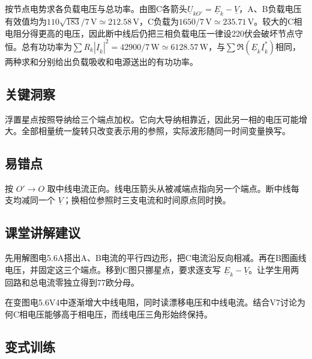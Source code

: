 \documentclass[UTF8,fontset=fandol,a4paper,11pt]{ctexart}
\begin{document}
按节点电势求各负载电压与总功率。由图C各箭头$\underline U_{kO'}=\underline E_k-\underline V$，A、B负载电压有效值均为$110\sqrt{183}/7\,\mathrm V\simeq212.58\,\mathrm V$，C负载为$1650/7\,\mathrm V\simeq235.71\,\mathrm V$。较大的C相电阻分得更高的电压，因此断中线后仍把三相负载电压一律设220伏会破坏节点守恒。总有功功率为$\sum R_k|\underline I_k|^2=42900/7\,\mathrm W\simeq6128.57\,\mathrm W$，与$\sum\Re(\underline E_k\underline I_k^*)$相同，两种求和分别给出负载吸收和电源送出的有功功率。




\subsection*{关键洞察}

浮置星点按照导纳给三个端点加权。它向大导纳相靠近，因此另一相的电压可能增大。全部相量统一旋转只改变表示用的参照，实际波形随同一时间变量换写。



\subsection*{易错点}

按 $O'\to O$ 取中线电流正向。线电压箭头从被减端点指向另一个端点。断中线每支均减同一个 $\underline V$；换相位参照时三支电流和时间原点同时换。



\subsection*{课堂讲解建议}

先用解图电5.6A搭出A、B电流的平行四边形，把C电流沿反向相减。再在B图画线电压，并固定这三个端点。移到C图只挪星点，要求逐支写 $\underline E_k-\underline V$。让学生用两回路和总电流零独立得到77欧分母。

在变图电5.6V4中逐渐增大中线电阻，同时读漂移电压和中线电流。结合V7讨论为何C相电压能够高于相电压，而线电压三角形始终保持。


\subsection*{变式训练}
\end{document}

